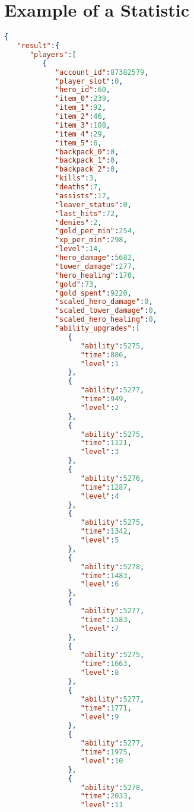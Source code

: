 \documentclass[12pt,a4paper]{book}
\begin{document}
\chapter{Example of a Statistic} \label{statexample}
\begin{lstlisting}[language=json,firstnumber=1]
{  
   "result":{  
      "players":[  
         {  
            "account_id":87382579,
            "player_slot":0,
            "hero_id":60,
            "item_0":239,
            "item_1":92,
            "item_2":46,
            "item_3":108,
            "item_4":29,
            "item_5":6,
            "backpack_0":0,
            "backpack_1":0,
            "backpack_2":0,
            "kills":3,
            "deaths":7,
            "assists":17,
            "leaver_status":0,
            "last_hits":72,
            "denies":2,
            "gold_per_min":254,
            "xp_per_min":298,
            "level":14,
            "hero_damage":5682,
            "tower_damage":277,
            "hero_healing":170,
            "gold":73,
            "gold_spent":9220,
            "scaled_hero_damage":0,
            "scaled_tower_damage":0,
            "scaled_hero_healing":0,
            "ability_upgrades":[  
               {  
                  "ability":5275,
                  "time":886,
                  "level":1
               },
               {  
                  "ability":5277,
                  "time":949,
                  "level":2
               },
               {  
                  "ability":5275,
                  "time":1121,
                  "level":3
               },
               {  
                  "ability":5276,
                  "time":1287,
                  "level":4
               },
               {  
                  "ability":5275,
                  "time":1342,
                  "level":5
               },
               {  
                  "ability":5278,
                  "time":1483,
                  "level":6
               },
               {  
                  "ability":5277,
                  "time":1583,
                  "level":7
               },
               {  
                  "ability":5275,
                  "time":1663,
                  "level":8
               },
               {  
                  "ability":5277,
                  "time":1771,
                  "level":9
               },
               {  
                  "ability":5277,
                  "time":1975,
                  "level":10
               },
               {  
                  "ability":5278,
                  "time":2033,
                  "level":11

\end{lstlisting}
\end{document}
